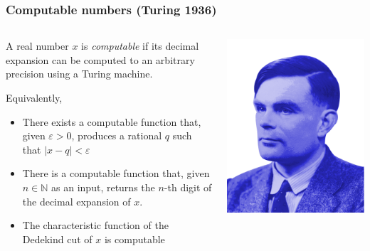 \documentclass{beamer}
\def\N{\mathbb{N}}
\begin{document}
\begin{frame}
    \frametitle{Computable numbers (Turing 1936)}
    \begin{columns}
        \begin{column}{.75\textwidth}
            A real number $x$ is \textit{computable} if its decimal expansion can be computed to an arbitrary precision using a Turing machine.

            \vspace{2em}
            Equivalently,
            \begin{itemize}
                \item There exists a computable function that, given $\varepsilon >0$, produces a rational $q$ such that $|x-q| < \varepsilon$
                \item There is a computable function that, given $n\in\N$ as an input, returns the $n$-th digit of the decimal expansion of $x$.
                \item The characteristic function of the Dedekind cut of $x$ is computable
            \end{itemize}
        \end{column}
        \begin{column}{.25\textwidth}
            \includegraphics[height=.25\textheight]{images/Turing.png}
            \vfill
        \end{column}
    \end{columns}
\end{frame}
\end{document}
